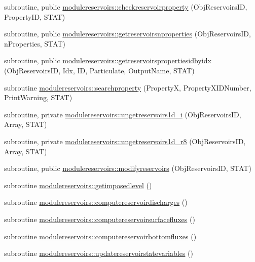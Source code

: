 \begin{DoxyCompactItemize}
\item 
subroutine, public \mbox{\hyperlink{namespacemodulereservoirs_ae639ba85f34ad23b758837c7842e91ed}{modulereservoirs\+::checkreservoirproperty}} (Obj\+Reservoirs\+ID, Property\+ID, S\+T\+AT)
\item 
subroutine, public \mbox{\hyperlink{namespacemodulereservoirs_a53b63e6050bd055646e8d248c77b9d39}{modulereservoirs\+::getreservoirsnproperties}} (Obj\+Reservoirs\+ID, n\+Properties, S\+T\+AT)
\item 
subroutine, public \mbox{\hyperlink{namespacemodulereservoirs_ac84a64521bf81b419760543bd55c1439}{modulereservoirs\+::getreservoirspropertiesidbyidx}} (Obj\+Reservoirs\+ID, Idx, ID, Particulate, Output\+Name, S\+T\+AT)
\item 
subroutine \mbox{\hyperlink{namespacemodulereservoirs_ae21cb91c7b00a7c56ed8f0d763dd75a2}{modulereservoirs\+::searchproperty}} (PropertyX, Property\+X\+I\+D\+Number, Print\+Warning, S\+T\+AT)
\item 
subroutine, private \mbox{\hyperlink{namespacemodulereservoirs_aef049b96a145e57423b0b2da90a0a934}{modulereservoirs\+::ungetreservoirs1d\+\_\+i}} (Obj\+Reservoirs\+ID, Array, S\+T\+AT)
\item 
subroutine, private \mbox{\hyperlink{namespacemodulereservoirs_abf51c8915a730bb078066132f1085b94}{modulereservoirs\+::ungetreservoirs1d\+\_\+r8}} (Obj\+Reservoirs\+ID, Array, S\+T\+AT)
\item 
subroutine, public \mbox{\hyperlink{namespacemodulereservoirs_a65da9561acff8444f90db1ccde975201}{modulereservoirs\+::modifyreservoirs}} (Obj\+Reservoirs\+ID, S\+T\+AT)
\item 
subroutine \mbox{\hyperlink{namespacemodulereservoirs_a7e40106c12c54cc753164ac30f0fbf04}{modulereservoirs\+::getimposedlevel}} ()
\item 
subroutine \mbox{\hyperlink{namespacemodulereservoirs_a8a99c19b113e1731bd473173c164300a}{modulereservoirs\+::computereservoirdischarges}} ()
\item 
subroutine \mbox{\hyperlink{namespacemodulereservoirs_ae746634227400b0849469114a5dc5c3f}{modulereservoirs\+::computereservoirsurfacefluxes}} ()
\item 
subroutine \mbox{\hyperlink{namespacemodulereservoirs_af226bfc3156ffdd375d5b81401036b46}{modulereservoirs\+::computereservoirbottomfluxes}} ()
\item 
subroutine \mbox{\hyperlink{namespacemodulereservoirs_a2c3bef9b0aaebe8a9cfd93bc27290e82}{modulereservoirs\+::updatereservoirstatevariables}} ()
\item 

\end{DoxyCompactItemize}
